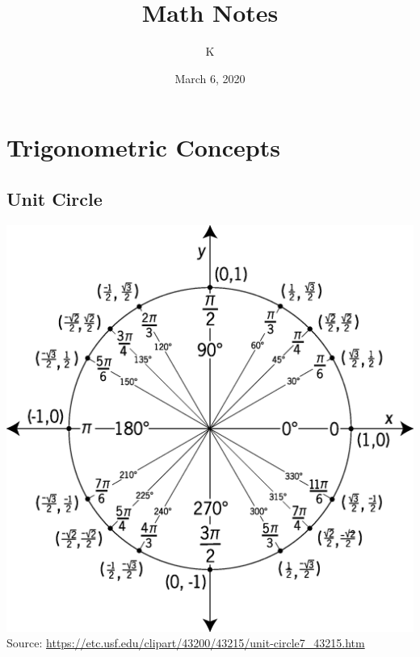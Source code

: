 \documentclass[12pt, letterpaper]{article}
\title{Math Notes}
\author{K}
\date{March 6, 2020}
\begin{document}

\maketitle

\tableofcontents{}
\pagebreak

\section{Trigonometric Concepts}
\subsection{Unit Circle}
\graphicspath{{./assets}}
\includegraphics[width = \textwidth]{unit-circle7_43215}
Source: \url{https://etc.usf.edu/clipart/43200/43215/unit-circle7_43215.htm}
\end{document}
